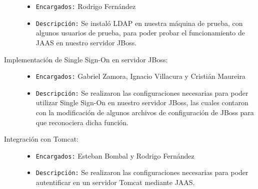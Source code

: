 \begin{description}
		\begin{itemize}
			\item \texttt{Encargados:} Rodrigo Fernández
			\item \texttt{Descripción:}
				Se instaló LDAP en nuestra máquina de prueba, con algunos
				usuarios de prueba, para poder probar el funcionamiento
				de JAAS en nuestro servidor JBoss.
		\end{itemize}
	\item[Implementación de Single Sign-On en servidor JBoss:]
		\begin{itemize}
			\item \texttt{Encargados:} Gabriel Zamora, Ignacio Villacura y Cristián Maureira
			\item \texttt{Descripción:}
				Se realizaron las configuraciones necesarias para poder utilizar
				Single Sign-On en nuestro servidor JBoss, las cuales contaron
				con la modificación de algunos archivos de configuración de JBoss
				para que reconociera dicha función.
		\end{itemize}
	\item[Integración con Tomcat:]
		\begin{itemize}
			\item \texttt{Encargados:} Esteban Bombal y Rodrigo Fernández
			\item \texttt{Descripción:}
				Se realizaron las configuraciones necesarias para poder autentificar en un servidor
				Tomcat mediante JAAS.
		\end{itemize}
\end{description}
